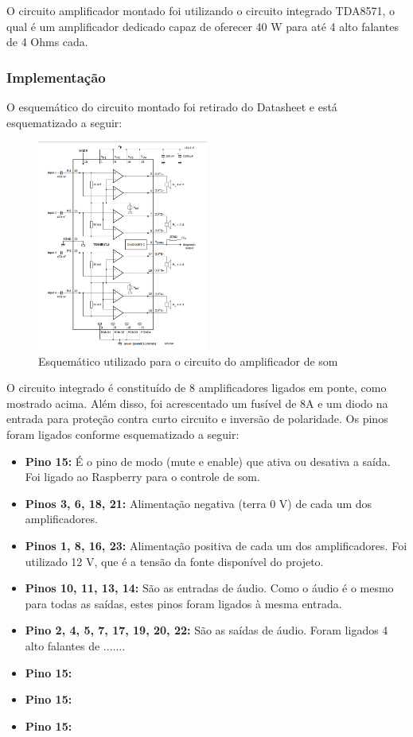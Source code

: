 O circuito amplificador montado foi utilizando o circuito integrado TDA8571, o qual é um amplificador dedicado capaz de oferecer 40 W para até 4 alto falantes de 4 Ohms cada.

\subsubsection{Implementação}

O esquemático do circuito montado foi retirado do Datasheet \cite{mq2} e está esquematizado a seguir:

\begin{figure}[H]
	\centering
    \includegraphics[width=0.5\textwidth]{figuras/circuito_TDA}
    \caption{Esquemático utilizado para o circuito do amplificador de som}
    \label{fig:circuito_TDA}
\end{figure}

O circuito integrado é constituído de 8 amplificadores ligados em ponte, como mostrado acima. Além disso, foi acrescentado um fusível de 8A e um diodo na entrada para proteção contra curto circuito e inversão de polaridade. Os pinos foram ligados conforme esquematizado a seguir:

\begin{itemize}
	\item \textbf{Pino 15:} É o pino de modo (mute e enable) que ativa ou desativa a saída. Foi ligado ao Raspberry para o controle de som.
    \item \textbf{Pinos 3, 6, 18, 21:} Alimentação negativa (terra 0 V) de cada um dos amplificadores.
    \item \textbf{Pinos 1, 8, 16, 23:} Alimentação positiva de cada um dos amplificadores. Foi utilizado 12 V, que é a tensão da fonte disponível do projeto.
    \item \textbf{Pinos 10, 11, 13, 14:} São as entradas de áudio. Como o áudio é o mesmo para todas as saídas, estes pinos foram ligados à mesma entrada.
    \item \textbf{Pino 2, 4, 5, 7, 17, 19, 20, 22:} São as saídas de áudio. Foram ligados 4 alto falantes de .......

    \item \textbf{Pino 15:}
    \item \textbf{Pino 15:}
    \item \textbf{Pino 15:}
\end{itemize}

